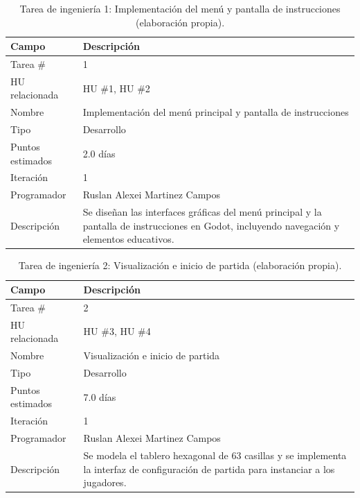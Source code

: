 \begin{table}[H]
\centering
\caption{Tarea de ingeniería 1: Implementación del menú y pantalla de instrucciones (elaboración propia).\label{tab:ti1}}
\begin{tabular}{|p{}|p{}|}
\hline
\textbf{Campo} & \textbf{Descripción} \\
\hline
Tarea \# & 1 \\
\hline
HU relacionada & HU \#1, HU \#2 \\
\hline
Nombre & Implementación del menú principal y pantalla de instrucciones \\
\hline
Tipo & Desarrollo \\
\hline
Puntos estimados & 2.0 días \\
\hline
Iteración & 1 \\
\hline
Programador & Ruslan Alexei Martinez Campos \\
\hline
Descripción & Se diseñan las interfaces gráficas del menú principal y la pantalla de instrucciones en Godot, incluyendo navegación y elementos educativos. \\
\hline
\end{tabular}
\end{table}

\begin{table}[H]
\centering
\caption{Tarea de ingeniería 2: Visualización e inicio de partida (elaboración propia).\label{tab:ti2}}
\begin{tabular}{|p{}|p{}|}
\hline
\textbf{Campo} & \textbf{Descripción} \\
\hline
Tarea \# & 2 \\
\hline
HU relacionada & HU \#3, HU \#4 \\
\hline
Nombre & Visualización e inicio de partida \\
\hline
Tipo & Desarrollo \\
\hline
Puntos estimados & 7.0 días \\
\hline
Iteración & 1 \\
\hline
Programador & Ruslan Alexei Martinez Campos \\
\hline
Descripción & Se modela el tablero hexagonal de 63 casillas y se implementa la interfaz de configuración de partida para instanciar a los jugadores. \\
\hline
\end{tabular}
\end{table}

